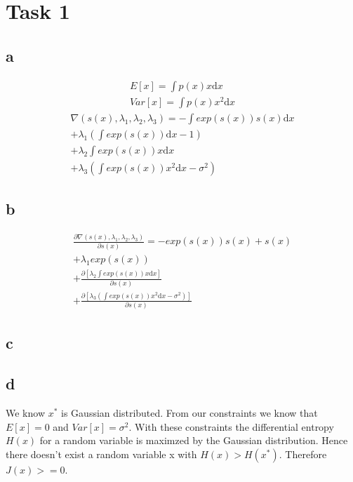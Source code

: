 \section*{Task 1}

\subsection*{a}
\begin{gather*}
E[x] = \int p(x) x \mathrm{d}x \\
Var[x] = \int p(x) x^2 \mathrm{d}x 
\end{gather*}
\begin{equation}
\begin{split}
\nabla(s(x), \lambda_1, \lambda_2, \lambda_3) = - \int exp(s(x))s(x) \mathrm{d}x \\
                                                  + \lambda_1(\int exp(s(x)) \mathrm{d}x - 1) \\
                                                  + \lambda_2 \int exp(s(x)) x \mathrm{d}x \\
                                                  + \lambda_3 (\int exp(s(x))x^2 \mathrm{d}x - \sigma^2)
\end{split}
\end{equation}

\subsection*{b}

\begin{equation}
\begin{split}
\frac{\partial \nabla(s(x), \lambda_1, \lambda_2, \lambda_3)}{\partial s(x)} = - exp(s(x))s(x) + s(x) \\
                                                  + \lambda_1 exp(s(x)) \\
                                                  + \frac{\partial [\lambda_2 \int exp(s(x)) x \mathrm{d}x]}{\partial s(x)} \\
                                                  + \frac{\partial [\lambda_3 (\int exp(s(x))x^2 \mathrm{d}x - \sigma^2)]}{\partial s(x)} 
\end{split}
\end{equation}

\subsection*{c}

\subsection*{d}

We know $x^{*}$ is Gaussian distributed. From our constraints we know that $E[x] = 0$ and $Var[x] = \sigma^{2}$. With these constraints the differential entropy $H(x)$ for a random variable is maximzed by the Gaussian distribution. Hence there doesn't exist a random variable x with $H(x)>H(x^*)$. Therefore $J(x) >= 0 $. 